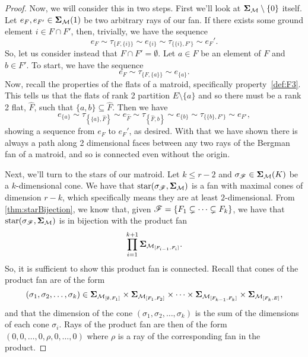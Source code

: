 \documentclass[12pt,oneside]{../../sfsuthesis}
\begin{document}
\begin{proof}
    Now, we will consider this in two steps.
    First we'll look at \( \bm{\Sigma}_{\mathcal{M}} \setminus \{ 0 \} \) itself.
    Let \( e_{F}, e_{F'} \in \bm{\Sigma}_{\mathcal{M}}(1) \) be two arbitrary rays of our fan.
    If there exists some ground element \( i \in F \cap F' \), then, trivially, we have the sequence
    \[
        e_F \sim \tau_{\{F, \{i\}\}} \sim e_{\{i\}} \sim \tau_{\{\{i\}, F'\}} \sim e_F'.
    \]
    So, let us consider instead that \( F \cap F' = \emptyset \).
    Let \( a \in F \) be an element of \( F \) and \( b \in F' \).
    To start, we have the sequence
    \[
        e_F \sim \tau_{\{F, \{a\}\}} \sim e_{\{a\}}.
    \]
    Now, recall the properties of the flats of a matroid, specifically property~\ref{def:F3}.
    This tells us that the flats of rank 2 partition \( E \setminus \{a\} \) and so there must be a rank 2 flat, \( \widehat{F} \), such that \( \{ a, b \} \subseteq \widehat{F} \).
    Then we have
    \[
        e_{\{a\}} \sim \tau_{\left\{\{a\}, \widehat{F}\right\}} \sim e_{\widehat{F}} \sim \tau_{\left\{\widehat{F}, b\right\}} \sim e_{\{b\}} \sim \tau_{\{\{b\}, F'\}} \sim e_{F'},
    \]
    showing a sequence from \( e_F \) to \( e_F' \), as desired.
    With that we have shown there is always a path along 2 dimensional faces between any two rays of the Bergman fan of a matroid, and so is connected even without the origin.

    Next, we'll turn to the stars of our matroid.
    Let \( k \leq r - 2 \) and \( \sigma_{\mathscr{F}} \in \bm{\Sigma}_{\mathcal{M}}(K) \) be a \( k \)-dimensional cone.
    We have that \( \operatorname{star}( \sigma_{\mathscr{F}}, \bm{\Sigma}_{\mathcal{M}}) \) is a fan with maximal cones of dimension \( r - k \), which specifically means they are at least \( 2 \)-dimensional.
    From \th\ref{thm:starBijection}, we know that, given \( \mathscr{F} = \{ F_1 \subsetneq \cdots \subsetneq F_k \} \), we have that \( \operatorname{star}( \sigma_{\mathscr{F}}, \bm{\Sigma}_{\mathcal{M}}) \) is in bijection with the product fan
    \[
        \prod_{i = 1}^{k+1} \bm{\Sigma}_{\mathcal{M}_{[F_{i-1}, F_i]}}.
    \]
    So, it is sufficient to show this product fan is connected.
    Recall that cones of the product fan are of the form
    \[
        (\sigma_1, \sigma_2, \dots, \sigma_k) \in \bm{\Sigma}_{\mathcal{M}_{[\emptyset, F_1]}} \times \bm{\Sigma}_{\mathcal{M}_{[F_{1}, F_2]}} \times \cdots \times \bm{\Sigma}_{\mathcal{M}_{[F_{k-1}, F_k]}} \times \bm{\Sigma}_{\mathcal{M}_{[F_{k}, E]}},
    \]
    and that the dimension of the cone \( (\sigma_1, \sigma_2, \dots, \sigma_k) \) is the sum of the dimensions of each cone \( \sigma_i \).
    Rays of the product fan are then of the form \( (0, 0, \dots, 0,  \rho, 0, \dots, 0) \) where \( \rho \) is a ray of the corresponding fan in the product.


\end{proof}
\end{document}
